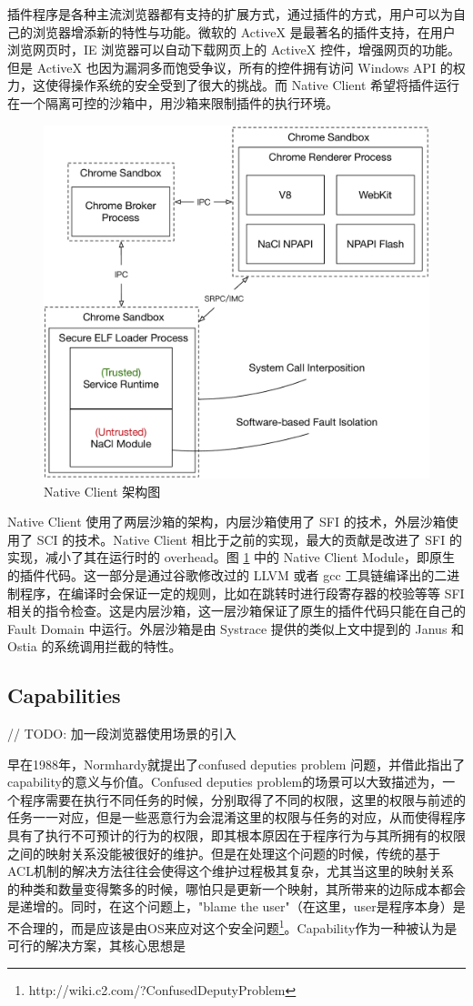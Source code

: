 \documentclass[final,12pt]{elsarticle}
\begin{document}
插件程序是各种主流浏览器都有支持的扩展方式，通过插件的方式，用户可以为自己的浏览器增添新的特性与功能。微软的 ActiveX 是最著名的插件支持，在用户浏览网页时，IE 浏览器可以自动下载网页上的 ActiveX 控件，增强网页的功能。但是 ActiveX 也因为漏洞多而饱受争议，所有的控件拥有访问 Windows API 的权力，这使得操作系统的安全受到了很大的挑战。而 Native Client 希望将插件运行在一个隔离可控的沙箱中，用沙箱来限制插件的执行环境。

\begin{figure}
\centering
\includegraphics[width=0.65\linewidth]{imgs/nacl}
\caption{Native Client 架构图}
\label{fig:nacl}
\end{figure}

Native Client 使用了两层沙箱的架构，内层沙箱使用了 SFI 的技术，外层沙箱使用了 SCI 的技术。Native Client 相比于之前的实现，最大的贡献是改进了 SFI 的实现，减小了其在运行时的 overhead。图 \ref{fig:nacl} 中的 Native Client Module，即原生的插件代码。这一部分是通过谷歌修改过的 LLVM 或者 gcc 工具链编译出的二进制程序，在编译时会保证一定的规则，比如在跳转时进行段寄存器的校验等等 SFI 相关的指令检查。这是内层沙箱，这一层沙箱保证了原生的插件代码只能在自己的 Fault Domain 中运行。外层沙箱是由 Systrace \cite{provos2003improving} 提供的类似上文中提到的 Janus 和 Ostia 的系统调用拦截的特性。

\subsection{Capabilities}
\label{ss:capabilities}

// TODO: 加一段浏览器使用场景的引入

早在1988年，Normhardy就提出了confused deputies problem \cite{deputies} 问题，并借此指出了capability的意义与价值。Confused deputies problem的场景可以大致描述为，一个程序需要在执行不同任务的时候，分别取得了不同的权限，这里的权限与前述的任务一一对应，但是一些恶意行为会混淆这里的权限与任务的对应，从而使得程序具有了执行不可预计的行为的权限，即其根本原因在于程序行为与其所拥有的权限之间的映射关系没能被很好的维护。但是在处理这个问题的时候，传统的基于ACL机制的解决方法往往会使得这个维护过程极其复杂，尤其当这里的映射关系的种类和数量变得繁多的时候，哪怕只是更新一个映射，其所带来的边际成本都会是递增的。同时，在这个问题上，"blame the user"（在这里，user是程序本身）是不合理的，而是应该是由OS来应对这个安全问题\footnote{http://wiki.c2.com/?ConfusedDeputyProblem}。Capability作为一种被认为是可行的解决方案，其核心思想是
\end{document}
